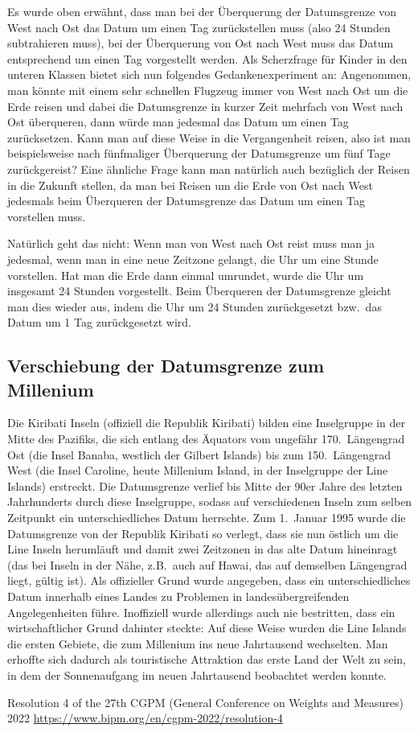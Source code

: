 Es wurde oben erw\"ahnt, 
dass man bei der \"Uberquerung der Datumsgrenze von West nach Ost das Datum
um einen Tag zur\"uckstellen muss (also 24 Stunden subtrahieren muss), bei der \"Uberquerung von Ost nach West
muss das Datum entsprechend um einen Tag vorgestellt werden. Als Scherzfrage f\"ur Kinder in den unteren Klassen
bietet sich nun folgendes Gedankenexperiment an: Angenommen, man k\"onnte mit einem sehr schnellen Flugzeug
immer von West nach Ost um die Erde reisen und dabei die Datumsgrenze in kurzer Zeit mehrfach von West nach
Ost \"uberqueren, dann w\"urde man jedesmal das Datum um einen Tag zur\"ucksetzen. Kann man auf diese Weise
in die Vergangenheit reisen, also ist man beispielsweise nach f\"unfmaliger \"Uberquerung der Datumsgrenze um
f\"unf Tage zur\"uckgereist? Eine \"ahnliche Frage kann man nat\"urlich auch bez\"uglich der Reisen in die
Zukunft stellen, da man bei Reisen um die Erde von Ost nach West jedesmals beim \"Uberqueren der Datumsgrenze
das Datum um einen Tag vorstellen muss. 

Nat\"urlich geht das nicht: Wenn man von West nach Ost reist muss man ja jedesmal, wenn man in eine neue
Zeitzone gelangt, die Uhr um eine Stunde vorstellen. Hat man die Erde dann einmal umrundet, wurde die Uhr um
insgesamt 24 Stunden vorgestellt. Beim \"Uberqueren der Datumsgrenze gleicht man dies wieder aus, indem die
Uhr um 24 Stunden zur\"uckgesetzt bzw.\ das Datum um 1 Tag zur\"uckgesetzt wird. 

\subsection{Verschiebung der Datumsgrenze zum Millenium}

Die Kiribati Inseln 
(offiziell die Republik Kiribati) bilden eine Inselgruppe in der Mitte des Pazifiks, die sich
entlang des \"Aquators vom ungef\"ahr 170.\ L\"angengrad Ost (die Insel Banaba, westlich der Gilbert Islands) 
bis zum 150.\ L\"angengrad West (die Insel Caroline, heute Millenium Island, in der Inselgruppe der Line Islands) 
erstreckt. Die Datumsgrenze verlief bis Mitte der 90er Jahre des letzten Jahrhunderts durch diese Inselgruppe, sodass
auf verschiedenen Inseln zum selben Zeitpunkt ein unterschiedliches Datum herrschte. Zum 1.\ Januar 1995 wurde
die Datumsgrenze von der Republik Kiribati so verlegt, dass sie nun \"ostlich um die Line Inseln heruml\"auft und damit
zwei Zeitzonen in das alte Datum hineinragt (das bei Inseln in der N\"ahe, z.B.\ auch auf Hawai, das
auf demselben L\"angengrad liegt, g\"ultig ist). Als offizieller Grund wurde
angegeben, dass ein unterschiedliches Datum innerhalb eines Landes zu Problemen in landes\"ubergreifenden
Angelegenheiten f\"uhre. Inoffiziell wurde allerdings auch nie bestritten, dass ein wirtschaftlicher Grund dahinter
steckte: Auf diese Weise wurden die Line Islands die ersten Gebiete, die zum Millenium ins neue Jahrtausend
wechselten. Man erhoffte sich dadurch als touristische Attraktion das erste Land der Welt zu sein, in dem der
Sonnenaufgang im neuen Jahrtausend beobachtet werden konnte.  

\begin{thebibliography}{99}
 Resolution 4 of the 27th CGPM (General Conference on Weights and Measures) 2022
\url{https://www.bipm.org/en/cgpm-2022/resolution-4}
\end{thebibliography}

%

